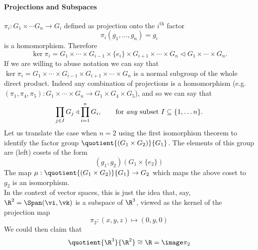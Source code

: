 \begin{asidep}\vspace{-12pt}
\paragraph{Projections and Subspaces}

$\pi_i:G_1\times\cdots G_n\to G_i$ defined as projection onto the $i^{\text{th}}$ factor
\[\pi_i(g_1,\ldots,g_n)=g_i\]
is a homomorphism. Therefore
\[\ker\pi_i=G_1\times\cdots\times G_{i-1}\times\{e_i\}\times G_{i+1}\times\cdots\times G_n\triangleleft G_1\times\cdots\times G_n.\]
If we are willing to abuse notation we can say that $\ker\pi_i=G_1\times\cdots\times G_{i-1}\times G_{i+1}\times\cdots\times G_n$ is a normal subgroup of the whole direct product. Indeed any combination of projections is a homomorphism (e.g.\ $(\pi_1,\pi_4,\pi_5):G_1\times\cdots\times G_n\to G_1\times G_4\times G_5$), and so we can say that
\[\prod_{j\in I}G_j\triangleleft\prod_{i=1}^n G_i,\qquad\text{for \emph{any} subset}\ I\subseteq\{1,\ldots n\}.\]
Let us translate the case when $n=2$ using the first isomorphism theorem to identify the factor group $\quotient{(G_1\times G_2)}{G_1}$. The elements of this group are (left) cosets of the form
\[(g_1,g_2)(G_1\times\{e_2\})\]
The map $\mu:\quotient{(G_1\times G_2)}{G_1}\to G_2$ which maps the above coset to $g_2$ is an isomorphism.\\
In the context of vector spaces, this is just the idea that, say, $\R^2=\Span(\vi,\vk)$ is a subspace of $\R^3$, viewed as the kernel of the projection map
\[\pi_2:(x,y,z)\mapsto (0,y,0)\]
We could then claim that
\[\quotient{\R^3}{\R^2}\cong\R=\image\pi_2\]
\end{asidep}


